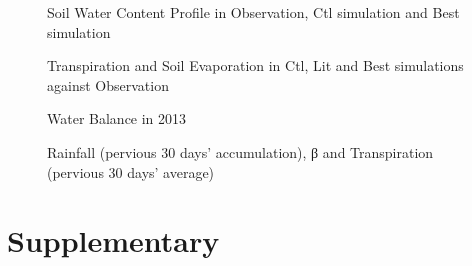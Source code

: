 \documentclass[12pt,a4paper,oneside]{article}
\newcommand{\beginsupplement}{%
        \setcounter{table}{0}
        \renewcommand{\thetable}{S\arabic{table}}%
        \setcounter{figure}{0}
        \renewcommand{\thefigure}{S\arabic{figure}}%
}
\begin{document}


\FloatBarrier

\begin{figure}[!hbtp]
\centering
{}
\caption{\small{Soil Water Content Profile in Observation, Ctl simulation and Best simulation}}
\label{}
\end{figure}

\begin{figure}[!hbtp]
\centering
{}
\caption{\small{Transpiration and Soil Evaporation in Ctl, Lit and Best simulations against Observation}}
\label{}
\end{figure}

\begin{figure}[!hbtp]
\centering
{}
\caption{\small{Water Balance in 2013}}
\label{}
\end{figure}

\begin{figure}[!hbtp]
\centering
{}
\caption{\small{Rainfall (pervious 30 days' accumulation), β and Transpiration (pervious 30 days' average)}}
\label{}
\end{figure}

\FloatBarrier
\newpage
\section*{Supplementary}
\beginsupplement


\end{document}
